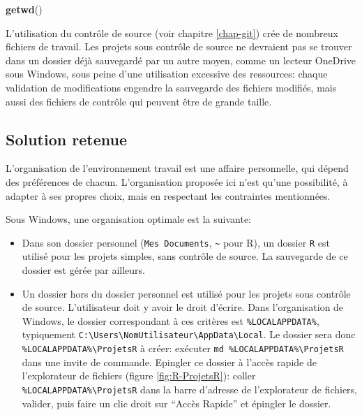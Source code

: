 \documentclass[
  12pt,
  french,
  a4paper,
  extrafontsizes,onecolumn,openright
  ]{memoir}
\newenvironment{Shaded}{\begin{snugshade}}{\end{snugshade}}
\newcommand{\FunctionTok}[1]{\textcolor[rgb]{0.13,0.29,0.53}{\textbf{#1}}}
\newcommand{\NormalTok}[1]{#1}
\providecommand{\tightlist}{%
  \setlength{\itemsep}{0pt}\setlength{\parskip}{0pt}}
\begin{document}
\scriptsize

\begin{Shaded}
\begin{Highlighting}[]
\FunctionTok{getwd}\NormalTok{()}
\end{Highlighting}
\end{Shaded}

\normalsize

L'utilisation du contrôle de source (voir chapitre \ref{chap-git}) crée de nombreux fichiers de travail.
Les projets sous contrôle de source ne devraient pas se trouver dans un dossier déjà sauvegardé par un autre moyen, comme un lecteur OneDrive sous Windows, sous peine d'une utilisation excessive des ressources: chaque validation de modifications engendre la sauvegarde des fichiers modifiés, mais aussi des fichiers de contrôle qui peuvent être de grande taille.

\subsection{Solution retenue}\label{sec:solution-dossiers}

L'organisation de l'environnement travail est une affaire personnelle, qui dépend des préférences de chacun.
L'organisation proposée ici n'est qu'une possibilité, à adapter à ses propres choix, mais en respectant les contraintes mentionnées.

Sous Windows, une organisation optimale est la suivante:

\begin{itemize}
\tightlist
\item
  Dans son dossier personnel (\texttt{Mes\ Documents}, \texttt{\textasciitilde{}} pour R), un dossier \texttt{R} est utilisé pour les projets simples, sans contrôle de source.
  La sauvegarde de ce dossier est gérée par ailleurs.
\item
  Un dossier hors du dossier personnel est utilisé pour les projets sous contrôle de source.
  L'utilisateur doit y avoir le droit d'écrire.
  Dans l'organisation de Windows, le dossier correspondant à ces critères est \texttt{\%LOCALAPPDATA\%}, typiquement \texttt{C:\textbackslash{}Users\textbackslash{}NomUtilisateur\textbackslash{}AppData}\break\texttt{\textbackslash{}Local}.
  Le dossier sera donc \texttt{\%LOCALAPPDATA\%\textbackslash{}ProjetsR} à créer: exécuter \texttt{md\ \%LOCALAPPDATA\%\textbackslash{}ProjetsR} dans une invite de commande.
  Epingler ce dossier à l'accès rapide de l'explorateur de fichiers (figure \ref{fig:R-ProjetsR}): coller \texttt{\%LOCALAPPDATA\%\textbackslash{}ProjetsR} dans la barre d'adresse de l'explorateur de fichiers, valider, puis faire un clic droit sur \enquote{Accès Rapide} et épingler le dossier.
\end{itemize}
\end{document}
